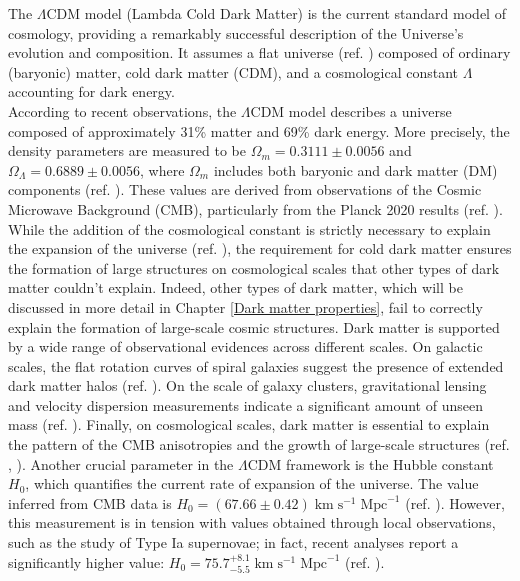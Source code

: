 The $\Lambda$CDM model (Lambda Cold Dark Matter) is the current standard model of cosmology, providing a remarkably successful description of the Universe's evolution and composition. It assumes a flat universe (ref. \cite{de_Bernardis_2000}) composed of ordinary (baryonic) matter, cold dark matter (CDM), and a cosmological constant $\Lambda$ accounting for dark energy.\\
According to recent observations, the $\Lambda$CDM model describes a universe composed of approximately 31\% matter and 69\% dark energy. More precisely, the density parameters are measured to be $\Omega_m = 0.3111 \pm 0.0056$ and $\Omega_\Lambda = 0.6889 \pm 0.0056$, where $\Omega_m$ includes both baryonic and dark matter (DM) components (ref. \cite{Planck2020}). These values are derived from observations of the Cosmic Microwave Background (CMB), particularly from the Planck 2020 results (ref. \cite{Planck2020}).
While the addition of the cosmological constant is strictly necessary to explain the expansion of the universe (ref. \cite{Riess_1998_accelerating_universe}), the requirement for cold dark matter ensures the formation of large structures on cosmological scales that other types of dark matter couldn't explain.
Indeed, other types of dark matter, which will be discussed in more detail in Chapter \ref{Dark matter properties}, fail to correctly explain the formation of large-scale cosmic structures.
Dark matter is supported by a wide range of observational evidences across different scales. On galactic scales, the flat rotation curves of spiral galaxies suggest the presence of extended dark matter halos (ref. \cite{Vera-Rubin}). On the scale of galaxy clusters, gravitational lensing and velocity dispersion measurements indicate a significant amount of unseen mass (ref. \cite{Empirical_proof_DM_lensing}). Finally, on cosmological scales, dark matter is essential to explain the pattern of the CMB anisotropies and the growth of large-scale structures (ref. \cite{Planck2020}, \cite{Nature_dark_matter_simulation}).
Another crucial parameter in the $\Lambda$CDM framework is the Hubble constant $H_0$, which quantifies the current rate of expansion of the universe. The value inferred from CMB data is $H_0 = (67.66 \pm 0.42) \; \text{km} \; \text{s}^{-1} \; \text{Mpc}^{-1}$ (ref. \cite{Planck2020}). However, this measurement is in tension with values obtained through local observations, such as the study of Type Ia supernovae; in fact, recent analyses report a significantly higher value: $H_0 = 75.7^{+8.1}_{-5.5} \; \text{km} \; \text{s}^{-1} \; \text{Mpc}^{-1}$ (ref. \cite{Pascale2024SN-H0-pe-measurement-H0}).
